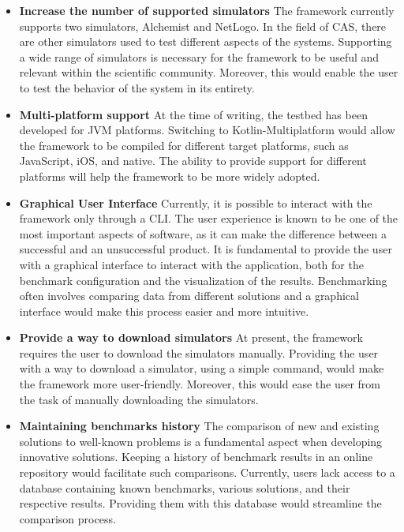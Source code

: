 \documentclass[12pt,a4paper,openright,twoside]{book}
\begin{document}
\begin{itemize}
  \item \textbf{Increase the number of supported simulators} 
  The framework currently supports two simulators, Alchemist and NetLogo.
  In the field of \ac*{CAS}, there are other simulators used to test different aspects of the systems.
  Supporting a wide range of simulators is necessary for the framework to be useful and relevant within the scientific community.
  Moreover, this would enable the user to test the behavior of the system in its entirety. 
  \item \textbf{Multi-platform support}
  At the time of writing, the testbed has been developed for JVM platforms. 
  Switching to Kotlin-Multiplatform would allow the framework to be compiled for different target platforms, such as JavaScript, iOS, and native.
  The ability to provide support for different platforms will help the framework to be more widely adopted.
  \item \textbf{Graphical User Interface}
  Currently, it is possible to interact with the framework only through a \ac*{CLI}.
  The user experience is known to be one of the most important aspects of software, as it can make the difference between a successful and an unsuccessful product.
  It is fundamental to provide the user with a graphical interface to interact with the application, both for the benchmark configuration and the visualization of the results.
  Benchmarking often involves comparing data from different solutions and a graphical interface would make this process easier and more intuitive.
  \item \textbf{Provide a way to download simulators}
  At present, the framework requires the user to download the simulators manually.
  Providing the user with a way to download a simulator, using a simple command, would make the framework more user-friendly.
  Moreover, this would ease the user from the task of manually downloading the simulators.
  \item \textbf{Maintaining benchmarks history}
  The comparison of new and existing solutions to well-known problems is a fundamental aspect when developing innovative solutions.
  Keeping a history of benchmark results in an online repository would facilitate such comparisons. 
  Currently, users lack access to a database containing known benchmarks, various solutions, and their respective results. 
  Providing them with this database would streamline the comparison process.
\end{itemize}
\end{document}
